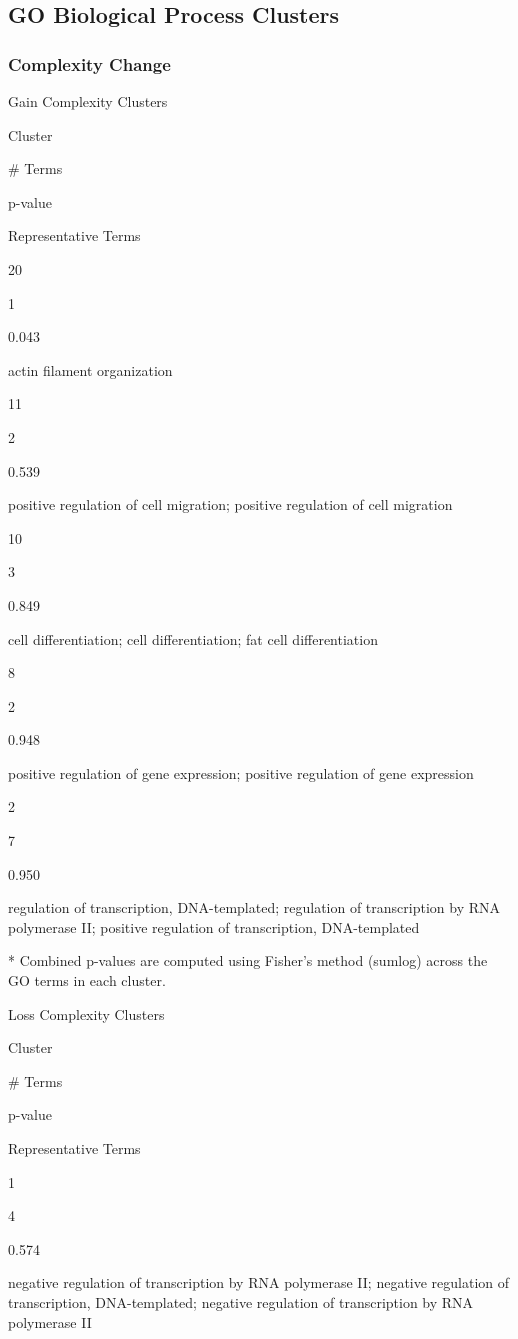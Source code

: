 \documentclass[
  letterpaper,
  DIV=11,
  numbers=noendperiod,
  openany,
  oneside]{scrreprt}
\begin{document}
\subsection{GO Biological Process Clusters}

\subsubsection{Complexity Change}

Gain Complexity Clusters

Cluster

\# Terms

p-value

Representative Terms

20

1

0.043

actin filament organization

11

2

0.539

positive regulation of cell migration; positive regulation of cell
migration

10

3

0.849

cell differentiation; cell differentiation; fat cell differentiation

8

2

0.948

positive regulation of gene expression; positive regulation of gene
expression

2

7

0.950

regulation of transcription, DNA-templated; regulation of transcription
by RNA polymerase II; positive regulation of transcription,
DNA-templated

* Combined p-values are computed using Fisher's method (sumlog) across
the GO terms in each cluster.

Loss Complexity Clusters

Cluster

\# Terms

p-value

Representative Terms

1

4

0.574

negative regulation of transcription by RNA polymerase II; negative
regulation of transcription, DNA-templated; negative regulation of
transcription by RNA polymerase II
\end{document}
